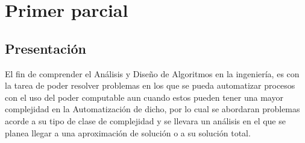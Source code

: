\documentclass[10pt,executivepaper]{article}
\begin{document}
\begin{center}
	\par{}
	\par{}
	\par{}
	\par\vspace{2cm}{
		Ultima fecha modificado: \today
	}
\end{center}

\clearpage
\tableofcontents
\clearpage

\section{Primer parcial}
\subsection{Presentación}
El fin de comprender el Análisis y Diseño de Algoritmos en la ingeniería, es con la tarea de poder resolver problemas en los que se pueda automatizar procesos con el uso del poder computable aun cuando estos pueden tener una mayor complejidad en la Automatización de dicho, por lo cual se abordaran problemas acorde a su tipo de clase de complejidad y se llevara un análisis en el que se planea llegar a una aproximación de solución o a su solución total.
\end{document}
